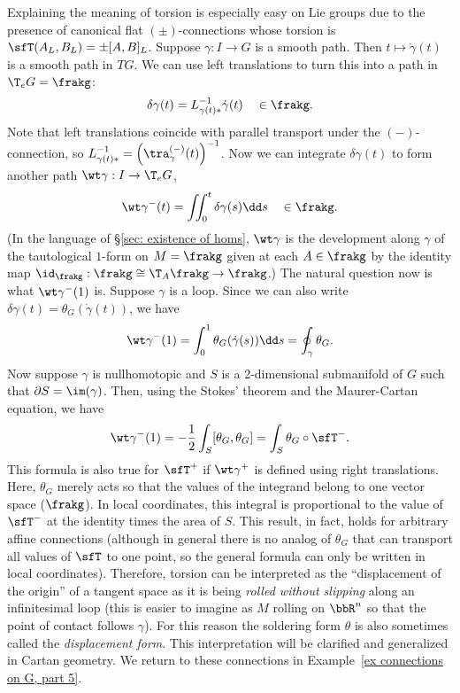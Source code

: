 \begin{example}
    Explaining the meaning of torsion is especially easy on Lie groups due to the presence of canonical flat $(\pm)$-connections whose torsion is $\sfT(A_L,B_L)=\pm [A,B]_L$. Suppose $\gamma:I\to G$ is a smooth path. Then $t\mapsto \dot\gamma(t)$ is a smooth path in $TG$. We can use left translations to turn this into a path in $\T_e G=\frakg$:
    \[\delta \gamma(t)=L_{\gamma(t)\ast}^{-1}\dot\gamma(t)\quad \in \frakg.\]
    Note that left translations coincide with parallel transport under the $(-)$-connection, so $L_{\gamma(t)\ast}^{-1}=\left(\tra^{(-)}_{\gamma}(t)\right)^{-1}$. Now we can integrate $\delta\gamma(t)$ to form another path $\wt\gamma:I\to \T_e G$,
    \[\wt\gamma^-(t)=\iint_0^t \delta\gamma(s)\dd s \quad \in \frakg.\]
    (In the language of \S\ref{sec: existence of homs}, $\wt\gamma$ is the development along $\gamma$ of the tautological $1$-form on $M=\frakg$ given at each $A\in\frakg$ by the identity map $\id_{\frakg}:\frakg\cong \T_A\frakg\to \frakg$.) The natural question now is what $\wt\gamma^-(1)$ is. Suppose $\gamma$ is a loop. Since we can also write $\delta\gamma(t)=\theta_G(\dot\gamma(t))$, we have
    \[\wt\gamma^-(1)=\int_0^1 \theta_G(\dot\gamma(s))\dd s=\oint_\gamma \theta_G.\]
    Now suppose $\gamma$ is nullhomotopic and $S$ is a 2-dimensional submanifold of $G$ such that $\partial S=\im(\gamma)$. Then, using the Stokes' theorem and the Maurer-Cartan equation, we have
    \[\wt\gamma^-(1)=-\frac12\int_S [\theta_G,\theta_G]=\int_S \theta_G\circ \sfT^-.\]
    This formula is also true for $\sfT^+$ if $\wt\gamma^+$ is defined using right translations. Here, $\theta_G$ merely acts so that the values of the integrand belong to one vector space ($\frakg$). In local coordinates, this integral is proportional to the value of $\sfT^-$ at the identity times the area of $S$. This result, in fact, holds for arbitrary affine connections (although in general there is no analog of $\theta_G$ that can transport all values of $\sfT$ to one point, so the general formula can only be written in local coordinates). Therefore, torsion can be interpreted as the ``displacement of the origin'' of a tangent space as it is being \emph{rolled without slipping} along an infinitesimal loop (this is easier to imagine as $M$ rolling on $\bbR^n$ so that the point of contact follows $\gamma$). For this reason the soldering form $\theta$ is also sometimes called the \emph{displacement form}. This interpretation will be clarified and generalized in Cartan geometry. We return to these connections in Example~\ref{ex connections on G, part 5}.
\end{example}







